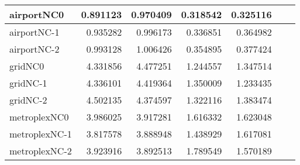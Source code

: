 \begin{longtable}{|l|r|r|r|r|r|r|}
airportNC0 & 0.891123 & 0.970409 & 0.318542 & 0.325116 \\ \hline
airportNC-1 & 0.935282 & 0.996173 & 0.336851 & 0.364982 \\ \hline
airportNC-2 & 0.993128 & 1.006426 & 0.354895 & 0.377424 \\ \hline
gridNC0 & 4.331856 & 4.477251 & 1.244557 & 1.347514 \\ \hline
gridNC-1 & 4.336101 & 4.419364 & 1.350009 & 1.233435 \\ \hline
gridNC-2 & 4.502135 & 4.374597 & 1.322116 & 1.383474 \\ \hline
metroplexNC0 & 3.986025 & 3.917281 & 1.616332 & 1.623048 \\ \hline
metroplexNC-1 & 3.817578 & 3.888948 & 1.438929 & 1.617081 \\ \hline
metroplexNC-2 & 3.923916 & 3.892513 & 1.789549 & 1.570189 \\ \hline
\end{longtable}
